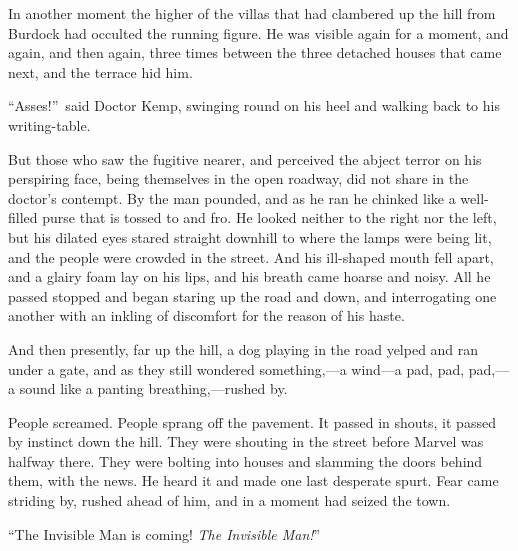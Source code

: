 In another moment the higher of the villas that had clambered up the hill from Burdock had occulted the running figure. He was visible again for a moment, and again, and then again, three times between the three detached houses that came next, and the terrace hid him.

“Asses!”\ said Doctor Kemp, swinging round on his heel and walking back to his writing-table.

But those who saw the fugitive nearer, and perceived the abject terror on his perspiring face, being themselves in the open roadway, did not share in the doctor’s contempt. By the man pounded, and as he ran he chinked like a well-filled purse that is tossed to and fro. He looked neither to the right nor the left, but his dilated eyes stared straight downhill to where the lamps were being lit, and the people were crowded in the street. And his ill-shaped mouth fell apart, and a glairy foam lay on his lips, and his breath came hoarse and noisy. All he passed stopped and began staring up the road and down, and interrogating one another with an inkling of discomfort for the reason of his haste.

And then presently, far up the hill, a dog playing in the road yelped and ran under a gate, and as they still wondered something,—a wind—a pad, pad, pad,—a sound like a panting breathing,—rushed by.

People screamed. People sprang off the pavement. It passed in shouts, it passed by instinct down the hill. They were shouting in the street before Marvel was halfway there. They were bolting into houses and slamming the doors behind them, with the news. He heard it and made one last desperate spurt. Fear came striding by, rushed ahead of him, and in a moment had seized the town.

“The Invisible Man is coming! \emph{The Invisible Man!}”
